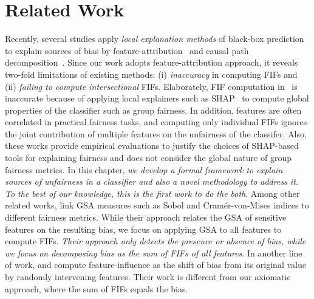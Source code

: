 

\section{Related Work} Recently, several studies apply \emph{local explanation methods} of black-box prediction to explain sources of bias by feature-attribution~\cite{begley2020explainability,lundberg2020explaining} and causal path decomposition~\cite{pan2021explaining}. Since our work adopts feature-attribution approach, it reveals two-fold limitations of existing methods: (i) \emph{inaccuracy} in computing FIFs and (ii) \emph{failing to compute intersectional} FIFs. Elaborately, FIF computation in~\cite{begley2020explainability,lundberg2020explaining} is inaccurate because of applying local explainers such as SHAP~\cite{lundberg2017unified} to compute global properties of the classifier such as group fairness. In addition, features are often correlated in practical fairness tasks, and computing only individual FIFs ignores the joint contribution of multiple features on the unfairness of the classifer. Also, these works provide empirical evaluations to justify the choices of SHAP-based tools for explaining fairness and does not consider the global nature of group fairness metrics. In this chapter, \textit{we develop a formal framework to explain sources of unfairness in a classifier and also a novel methodology to address it. To the best of our knowledge, this is the first work to do the both}. %
Among other related works, \cite{benesse2021fairness} link GSA measures such as Sobol and Cram{\'e}r-von-Mises indices to different fairness metrics. While their approach relates the GSA of sensitive features on the resulting bias, we focus on applying GSA to all features to compute FIFs. \textit{Their approach only detects the presence or absence of bias, while we focus on decomposing bias as the sum of FIFs of all features}. In another line of work, \cite{datta2016algorithmic} and \cite{ghosh2022algorithmic} compute feature-influence as the shift of bias from its original value by randomly intervening features. Their work is different from our axiomatic approach, where the sum of FIFs equals the bias.
